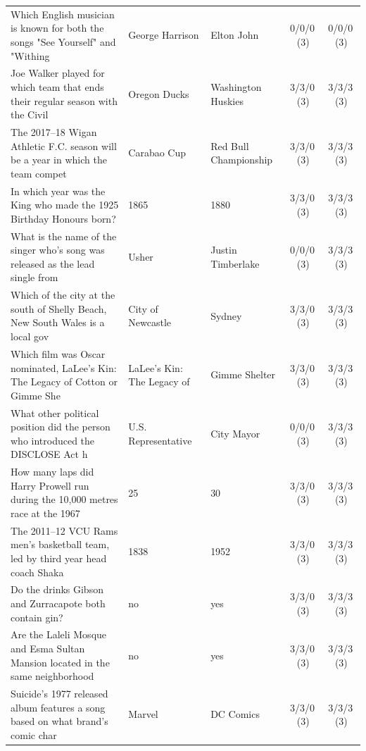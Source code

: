 \begin{longtable}{@{}p{6.6cm}p{2.9cm}p{2.9cm}cc@{}}
\rowcolor{neutralgray}
Which English musician is known for both the songs "See Yourself" and "Withing & George Harrison & Elton John & 0/0/0\,\footnotesize(3) & 0/0/0\,\footnotesize(3) \\
Joe Walker played for which team that ends their regular season with the Civil & Oregon Ducks & Washington Huskies & 3/3/0\,\footnotesize(3) & 3/3/3\,\footnotesize(3) \\
\rowcolor{neutralgray}
The 2017–18 Wigan Athletic F.C. season will be a year in which the team compet & Carabao Cup & Red Bull Championship & 3/3/0\,\footnotesize(3) & 3/3/3\,\footnotesize(3) \\
In which year was the King who made the 1925 Birthday Honours born? & 1865 & 1880 & 3/3/0\,\footnotesize(3) & 3/3/3\,\footnotesize(3) \\
\rowcolor{neutralgray}
What is the name of the singer who's song was released as the lead single from & Usher & Justin Timberlake & 0/0/0\,\footnotesize(3) & 3/3/3\,\footnotesize(3) \\
Which of the city at the south of Shelly Beach, New South Wales is a local gov & City of Newcastle & Sydney & 3/3/0\,\footnotesize(3) & 3/3/3\,\footnotesize(3) \\
\rowcolor{neutralgray}
Which film was Oscar nominated, LaLee's Kin: The Legacy of Cotton or Gimme She & LaLee's Kin: The Legacy of & Gimme Shelter & 3/3/0\,\footnotesize(3) & 3/3/3\,\footnotesize(3) \\
What other political position did the person who introduced the DISCLOSE Act h & U.S. Representative & City Mayor & 0/0/0\,\footnotesize(3) & 3/3/3\,\footnotesize(3) \\
\rowcolor{neutralgray}
How many laps did Harry Prowell run during the 10,000 metres race at the 1967  & 25 & 30 & 3/3/0\,\footnotesize(3) & 3/3/3\,\footnotesize(3) \\
The 2011–12 VCU Rams men's basketball team, led by third year head coach Shaka & 1838 & 1952 & 3/3/0\,\footnotesize(3) & 3/3/3\,\footnotesize(3) \\
\rowcolor{neutralgray}
Do the drinks Gibson and Zurracapote both contain gin? & no & yes & 3/3/0\,\footnotesize(3) & 3/3/3\,\footnotesize(3) \\
Are the Laleli Mosque and Esma Sultan Mansion located in the same neighborhood & no & yes & 3/3/0\,\footnotesize(3) & 3/3/3\,\footnotesize(3) \\
\rowcolor{neutralgray}
Suicide's 1977 released album features a song based on what brand's comic char & Marvel & DC Comics & 3/3/0\,\footnotesize(3) & 3/3/3\,\footnotesize(3) \\

\end{longtable}

